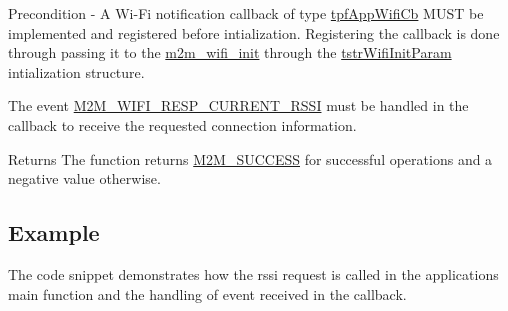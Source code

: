 \begin{DoxyPrecond}{Precondition}
-\/ A Wi-\/\+Fi notification callback of type \hyperlink{group__WlanEnums_gac5302f32839285fe8375c159087aa8a1}{tpf\+App\+Wifi\+Cb} M\+U\+ST be implemented and registered before intialization. Registering the callback is done through passing it to the \hyperlink{group__WifiInitFn_ga73c734812e844d96d860c4e93e9daf35}{m2m\+\_\+wifi\+\_\+init} through the \hyperlink{structtstrWifiInitParam}{tstr\+Wifi\+Init\+Param} intialization structure.
\begin{DoxyItemize}
\item The event \hyperlink{group__WlanEnums_gga57466b36df595c593e7ccc9892e14b20ae2f28d3ff5c4356502abfc26d8f6e5f1}{M2\+M\+\_\+\+W\+I\+F\+I\+\_\+\+R\+E\+S\+P\+\_\+\+C\+U\+R\+R\+E\+N\+T\+\_\+\+R\+S\+SI} must be handled in the callback to receive the requested connection information. 
\end{DoxyItemize}
\end{DoxyPrecond}
\begin{DoxyReturn}{Returns}
The function returns \hyperlink{nm__common_8h_a9ef27ba27aafdd1aa3a79d3ba2c36b8f}{M2\+M\+\_\+\+S\+U\+C\+C\+E\+SS} for successful operations and a negative value otherwise. 
\end{DoxyReturn}
\hypertarget{group__WifiEnableMonitorModeFn_Example}{}\subsection{Example}\label{group__WifiEnableMonitorModeFn_Example}
The code snippet demonstrates how the rssi request is called in the application\textquotesingle{}s main function and the handling of event received in the callback. 
